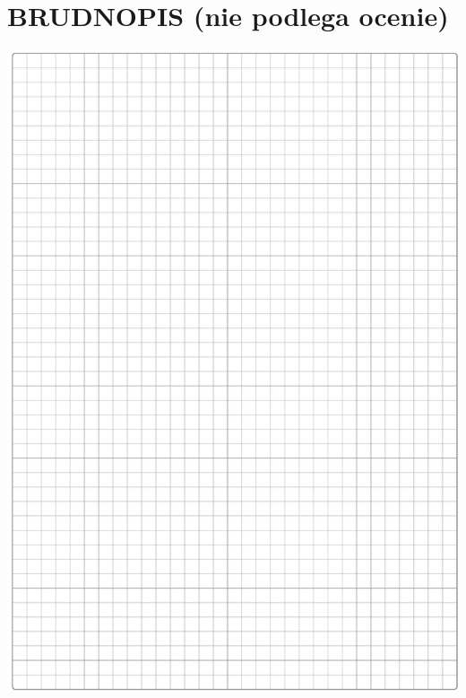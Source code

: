 \documentclass[10pt]{article}
\begin{document}
\section*{BRUDNOPIS (nie podlega ocenie)}
\begin{center}
\includegraphics[max width=\textwidth]{2024_11_21_769d5953f978b92e06f5g-16}
\end{center}
\end{document}

